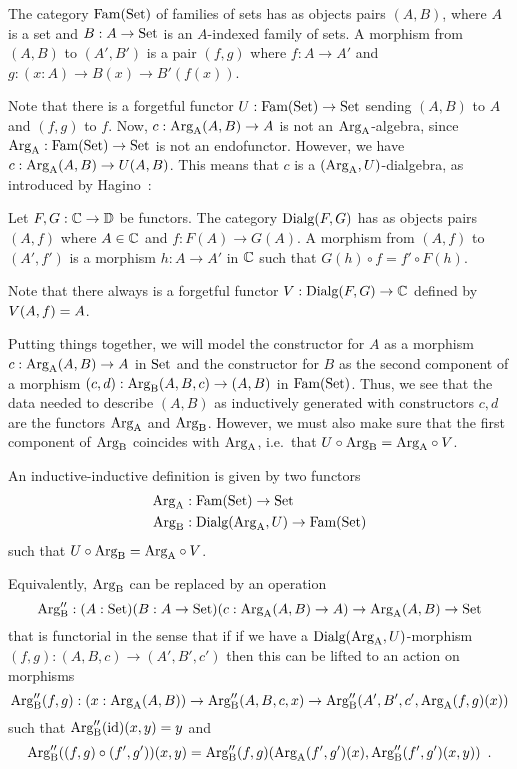 \documentclass[orivec,envcountsame, ,envcountsect]{llncs}
\begin{document}
\begin{definition}
  The category $\text{Fam}(\text{Set})$ of families of sets has as objects pairs $(A,
  B)$, where $A$ is a set and $B : A \to \text{Set}$ is an $A$-indexed family
  of sets. A morphism from $(A, B)$ to $(A', B')$ is a pair $(f, g)$
  where $f : A \to A'$ and ${g : (x : A) \to B(x) \to B'(f(x))}$.
\end{definition}
Note that there is a forgetful functor $U : \text{Fam}(\text{Set}) \to \text{Set}$
sending $(A, B)$ to $A$ and $(f, g)$ to $f$.
Now, $c : \text{Arg}_{\text{A}}(A, B) \to A$ is not an $\text{Arg}_{\text{A}}$-algebra,
since $\text{Arg}_{\text{A}} : \text{Fam}(\text{Set}) \to \text{Set}$ is not an endofunctor. However, we have $c :
\text{Arg}_{\text{A}}(A, B) \to U(A, B)$. This means that $c$ is a $(\text{Arg}_{\text{A}},
U)$-dialgebra, as introduced by Hagino~\cite{hagino1987phdthesis}:

\begin{definition}
  Let $F, G : \mathbb{C} \to \mathbb{D}$ be functors. The category $\text{Dialg}(F, G)$ has
  as objects pairs $(A, f)$ where $A \in \mathbb{C}$ and $f : F(A) \to
  G(A)$. A morphism from $(A, f)$ to $(A', f')$ is a morphism $h : A
  \to A'$ in $\mathbb{C}$ such that $G(h) \circ f = f' \circ F(h)$.
\end{definition}
Note that there always is a forgetful functor $V : \text{Dialg}(F, G) \to \mathbb{C}$
defined by $V(A, f) = A$.

Putting things together, we will model the constructor for $A$ as a
morphism $c : \text{Arg}_{\text{A}}(A, B) \to A$ in $\text{Set}$ and the constructor for $B$
as the second component of a morphism $(c, d) : \text{Arg}_{\text{B}}(A, B, c) \to (A,
B)$ in $\text{Fam}(\text{Set})$. Thus, we see that the data needed to describe $(A,
B)$ as inductively generated with constructors $c, d$ are
the functors $\text{Arg}_{\text{A}}$ and $\text{Arg}_{\text{B}}$. However, we must also make sure that
the first component of $\text{Arg}_{\text{B}}$ coincides with $\text{Arg}_{\text{A}}$, i.e.\ that
$U \circ \text{Arg}_{\text{B}} = \text{Arg}_{\text{A}} \circ V$.
\begin{definition} \label{def:indind-functors}
  An inductive-inductive definition is given by two functors
  \begin{align*}
    \text{Arg}_{\text{A}} &: \text{Fam}(\text{Set}) \to \text{Set} \\
    \text{Arg}_{\text{B}} &: \text{Dialg}(\text{Arg}_{\text{A}}, U) \to \text{Fam}(\text{Set})
  \end{align*}
  such that $U \circ \text{Arg}_{\text{B}} = \text{Arg}_{\text{A}} \circ V$.
\end{definition}

\begin{lemma}
Equivalently, $\text{Arg}_{\text{B}}$ can be replaced by an operation
\[
\text{Arg}_{\text{B}}'' : (A : \text{Set})(B : A \to \text{Set})(c : \text{Arg}_{\text{A}}(A, B) \to A) \to \text{Arg}_{\text{A}}(A, B) \to \text{Set}
\]
that is functorial in the sense that if if we have a
$\text{Dialg}(\text{Arg}_{\text{A}}, U)$-morphism $(f, g) : (A, B, c) \to (A', B',
c')$ then this can be lifted to an action on morphisms
 \[\text{Arg}_{\text{B}}''(f, g) : (x : \text{Arg}_{\text{A}}(A, B)) \to \text{Arg}_{\text{B}}''(A, B,
   c, x) \to \text{Arg}_{\text{B}}''(A', B', c', \text{Arg}_{\text{A}}(f, g)(x))
\]
such that $\text{Arg}_{\text{B}}''(\text{id})(x, y) = y$ and
\[
\text{Arg}_{\text{B}}''((f, g) \circ (f', g'))(x, y) =\text{Arg}_{\text{B}}''(f, g)(\text{Arg}_{\text{A}}(f', g')(x), \text{Arg}_{\text{B}}''(f',g')(x, y)) \enspace .
\]
\end{lemma}
\end{document}
